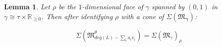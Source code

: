 \documentclass[12pt, oneside]{amsart}   	%
\newcounter{thm}
\newtheorem{lemma}[thm]{Lemma}
\numberwithin{equation}{section}
\numberwithin{thm}{section}
\numberwithin{figure}{section}
\begin{document}


\begin{lemma}\label{strict}
Let $\rho$ be the $1$-dimensional face of $\gamma$ spanned by $(0,1)$ in $\gamma \cong \tau \times \mathbb{R}_{\ge 0}$. Then after identifying $\rho$ with a cone of $\Sigma(\mathfrak{M}_{\pmb\gamma})$:

\[\Sigma(\mathfrak{M}^\theta_{deg(L) - \sum_i a_iv_i}) = \Sigma(\mathfrak{M}_{\gamma})_{\rho}\]


\end{lemma}
\end{document}
